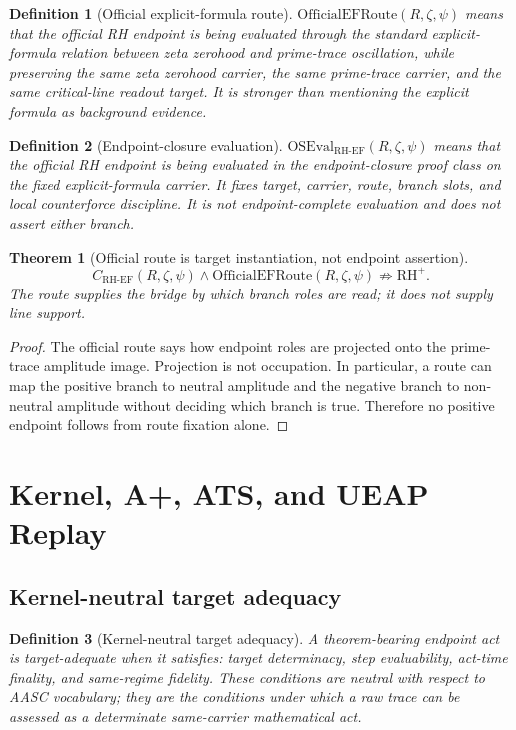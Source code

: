\documentclass[11pt]{article}
\newtheorem{definition}{Definition}[section]
\newtheorem{theorem}{Theorem}[section]
\newcommand{\RH}{\mathrm{RH}}
\newcommand{\CRHEF}{C_{\mathrm{RH}\text{-}\mathrm{EF}}}
\newcommand{\OfficialEFRoute}{\mathrm{OfficialEFRoute}}
\newcommand{\OSEvalEF}{\mathrm{OSEval}_{\mathrm{RH}\text{-}\mathrm{EF}}}
\begin{document}
\begin{definition}[Official explicit-formula route]
\(\OfficialEFRoute(R,\zeta,\psi)\) means that the official RH endpoint is being evaluated through the standard explicit-formula relation between zeta zerohood and prime-trace oscillation, while preserving the same zeta zerohood carrier, the same prime-trace carrier, and the same critical-line readout target.  It is stronger than mentioning the explicit formula as background evidence.
\end{definition}

\begin{definition}[Endpoint-closure evaluation]
\(\OSEvalEF(R,\zeta,\psi)\) means that the official RH endpoint is being evaluated in the endpoint-closure proof class on the fixed explicit-formula carrier.  It fixes target, carrier, route, branch slots, and local counterforce discipline.  It is not endpoint-complete evaluation and does not assert either branch.
\end{definition}

\begin{theorem}[Official route is target instantiation, not endpoint assertion]
\[
\CRHEF(R,\zeta,\psi)\wedge \OfficialEFRoute(R,\zeta,\psi)
\not\Rightarrow \RH^+.
\]
The route supplies the bridge by which branch roles are read; it does not supply line support.
\end{theorem}

\begin{proof}
The official route says how endpoint roles are projected onto the prime-trace amplitude image.  Projection is not occupation.  In particular, a route can map the positive branch to neutral amplitude and the negative branch to non-neutral amplitude without deciding which branch is true.  Therefore no positive endpoint follows from route fixation alone.
\end{proof}

\section{Kernel, A+, ATS, and UEAP Replay}

\subsection{Kernel-neutral target adequacy}

\begin{definition}[Kernel-neutral target adequacy]
A theorem-bearing endpoint act is target-adequate when it satisfies: target determinacy, step evaluability, act-time finality, and same-regime fidelity.  These conditions are neutral with respect to AASC vocabulary; they are the conditions under which a raw trace can be assessed as a determinate same-carrier mathematical act.
\end{definition}
\end{document}
